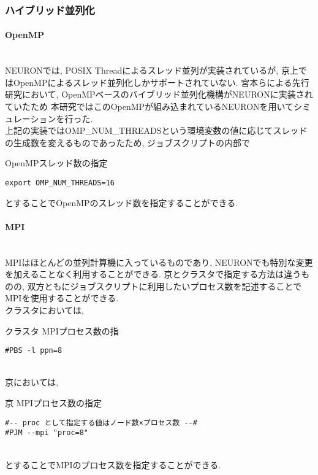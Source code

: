 \subsubsection{ハイブリッド並列化}
\label{subsubsec:hybrid}
\paragraph{OpenMP}~\\
NEURONでは, POSIX Threadによるスレッド並列が実装されているが, 京上ではOpenMPによるスレッド並列化しかサポートされていない.
宮本らによる先行研究\cite{miyamoto-master}において, OpenMPベースのバイブリッド並列化機構がNEURONに実装されていたため
本研究ではこのOpenMPが組み込まれているNEURONを用いてシミュレーションを行った.\\
上記の実装ではOMP\_NUM\_THREADSという環境変数の値に応じてスレッドの生成数を変えるものであったため, ジョブスクリプトの内部で
\begin{table}[htb]
\caption {OpenMPスレッド数の指定}
{\footnotesize
\begin{framed}
\begin{verbatim}
export OMP_NUM_THREADS=16
\end{verbatim}
\end{framed}
}
\end{table}
とすることでOpenMPのスレッド数を指定することができる.

\paragraph{MPI}~\\
MPIはほとんどの並列計算機に入っているものであり, NEURONでも特別な変更を加えることなく利用することができる.
京とクラスタで指定する方法は違うものの, 双方ともにジョブスクリプトに利用したいプロセス数を記述することでMPIを使用することができる.\\
クラスタにおいては,
\begin{table}[htb]
  \caption {クラスタ MPIプロセス数の指}
{\footnotesize
\begin{framed}
\begin{verbatim}
#PBS -l ppn=8
\end{verbatim}
\end{framed}
}
\end{table}
\\
京においては,\\
\begin{table}[htb]
  \caption {京 MPIプロセス数の指定}
{\footnotesize
\begin{framed}
\begin{verbatim}
#-- proc として指定する値はノード数×プロセス数 --#
#PJM --mpi "proc=8"
\end{verbatim}
\end{framed}
}
\end{table}\\
とすることでMPIのプロセス数を指定することができる.\\

